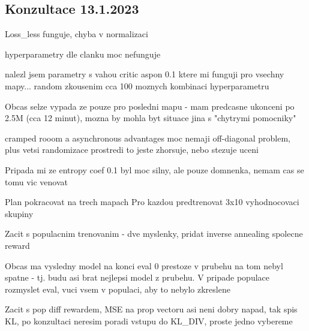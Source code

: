 \documentclass{report}
\begin{document}
\subsection*{Konzultace 13.1.2023}
\begin{list}{}{}
    \item Loss\_less funguje, chyba v normalizaci
    \item hyperparametry dle clanku moc nefunguje
    \item nalezl jsem parametry s vahou critic aspon 0.1 ktere mi funguji pro vsechny mapy... random zkousenim cca 100 moznych kombinaci hyperparametru
    \item Obcas selze vypada ze pouze pro posledni mapu - mam predcasne ukonceni po 2.5M (cca 12 minut), mozna by mohla byt situace jina s "chytrymi pomocniky"
    \item cramped rooom a asynchronous advantages moc nemaji off-diagonal problem, plus vetsi randomizace prostredi to jeste zhorsuje, nebo stezuje uceni
    \item Pripada mi ze entropy coef 0.1 byl moc silny, ale pouze domnenka, nemam cas se tomu vic venovat
    \item Plan pokracovat na trech mapach Pro kazdou predtrenovat 3x10 vyhodnocovaci skupiny
    \item Zacit s populacnim trenovanim - dve myslenky, pridat inverse annealing spolecne reward
    \item Obcas ma vysledny model na konci eval 0 prestoze v prubehu na tom nebyl spatne - tj. budu asi brat nejlepsi model z prubehu. 
        V pripade populace rozmyslet eval, vuci vsem v populaci, aby to nebylo zkreslene
    \item Zacit s pop diff rewardem, MSE na prop vectoru asi neni dobry napad, tak spis KL, po konzultaci neresim poradi vstupu do KL\_DIV, proste jedno vybereme 
\end{list}
\end{document}
